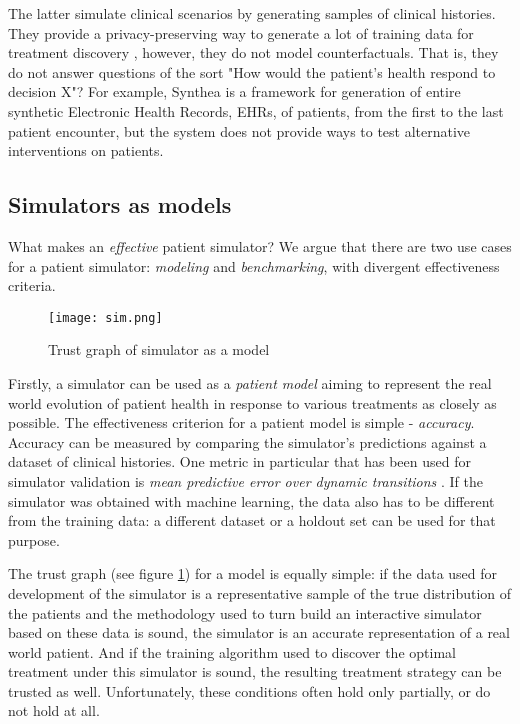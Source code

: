 The latter simulate clinical scenarios by generating samples of clinical histories.
They provide a privacy-preserving way to generate a lot of training data for treatment discovery \cite{privacy1,privacy2,privacy3,privacy4}, however, they do not model counterfactuals. That is, they do not answer questions of the sort "How would the patient's health respond to decision X"? For example, Synthea \cite{synthea} is a framework for generation of entire synthetic Electronic Health Records, EHRs, of patients, from the first to the last patient encounter, but the system does not provide ways to test alternative interventions on patients. 

\subsection{Simulators as models}

What makes an \emph{effective} patient simulator? 
We argue that there are two use cases for a patient simulator: {\sl modeling} and {\sl benchmarking}, with divergent effectiveness criteria.

\begin{figure}
    \centering
    \texttt{[image: sim.png]}
    \caption{Trust graph of simulator as a model}
    \label{fig:model}
\end{figure}

Firstly, a simulator can be used as a \emph{patient model} aiming to represent the real world evolution of patient health in response to various treatments as closely as possible.
The effectiveness criterion for a patient model is simple - \emph{accuracy}.
Accuracy can be measured by comparing the simulator's predictions against a dataset of clinical histories.
One metric in particular that has been used for simulator validation is \emph{mean predictive error over dynamic transitions} \cite{mdpe}.
If the simulator was obtained with machine learning, the data also has to be different from the training data: a different dataset or a holdout set can be used for that purpose.

The trust graph (see figure \ref{fig:model}) for a model is equally simple: if the data used for development of the simulator is a representative sample of the true distribution of the patients and the methodology used to turn build an interactive simulator based on these data is sound, the simulator is an accurate representation of a real world patient.
And if the training algorithm used to discover the optimal treatment under this simulator is sound, the resulting treatment strategy can be trusted as well.
Unfortunately, these conditions often hold only partially, or do not hold at all.

